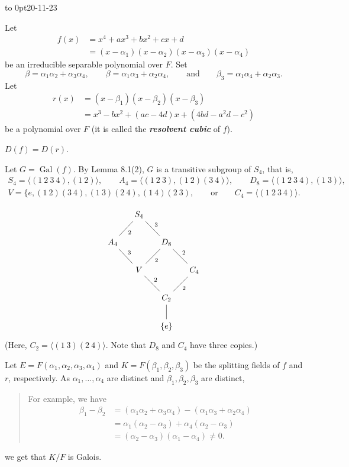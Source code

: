 \documentclass[twoside]{article}
\DeclareMathOperator\Gal{Gal}
\theoremstyle{remark}
\newcommand*\term[1]{\textbf{\textit{\mathversion{bold}#1}}}
\newcommand*\newclass[1]{\par\vbox to 0pt{\hbox{\tiny\sffamily\color{gray}#1}} \par\ignorespaces}
\begin{document}
\newclass{20-11-23}

Let
\begin{align*}
  f(x) & = x^4 + ax^3 + bx^2 + cx + d \\
  & = (x-\alpha_1)(x-\alpha_2)(x-\alpha_3)(x-\alpha_4)
\end{align*}
be an irreducible separable polynomial over \(F\). Set
\[ \beta = \alpha_1\alpha_2 + \alpha_3\alpha_4, \qquad \beta = \alpha_1\alpha_3 + \alpha_2\alpha_4, \qquad \text{and} \qquad \beta_3 = \alpha_1\alpha_4 + \alpha_2\alpha_3. \]
Let
\begin{align*}
  r(x) & = (x-\beta_1)(x-\beta_2)(x-\beta_3) \\
  & = x^3 - bx^2 + (ac-4d)x + (4bd-a^2d-c^2)
\end{align*}
be a polynomial over \(F\) (it is called the \term{resolvent cubic} of \(f\)).

\begin{lemma}
  \(D(f) = D(r)\).
\end{lemma}

Let \(G = \Gal(f)\). By Lemma 8.1(2), \(G\) is a transitive subgroup of \(S_4\), that is,
\begin{gather*}
  S_4 = \langle (1~2~3~4), (1~2) \rangle, \qquad A_4 = \langle (1~2~3), (1~2)(3~4) \rangle, \qquad D_8 = \langle (1~2~3~4), (1~3) \rangle, \\ V = \{e, (1~2)(3~4), (1~3)(2~4), (1~4)(2~3), \qquad \text{or} \qquad C_4 = \langle (1~2~3~4) \rangle.
\end{gather*}

\begin{displaymath}
  \begin{tikzcd}[column sep=small]
    & S_4 \dlar["2",dash]\drar["3",dash] \\
    A_4\drar["3",dash] && D_8\dlar["2",dash]\drar["2",dash] \\
    & V\drar["2",dash] && C_4\dlar["2",dash] \\
    && C_2\dar[dash] \\
    && \{e\}
  \end{tikzcd}
\end{displaymath}
(Here, \(C_2 = \langle (1~3)(2~4) \rangle\). Note that \(D_8\) and \(C_4\) have three copies.)

Let \(E = F(\alpha_1,\alpha_2,\alpha_3,\alpha_4)\) and \(K = F(\beta_1,\beta_2,\beta_3)\) be the splitting fields of \(f\) and \(r\), respectively. As \(\alpha_1, \dots, \alpha_4\) are distinct and \(\beta_1, \beta_2, \beta_3\) are distinct,
\begin{quote}\small
  For example, we have
  \begin{align*}
    \beta_1 - \beta_2 & = (\alpha_1\alpha_2 + \alpha_3\alpha_4) - (\alpha_1\alpha_3 + \alpha_2\alpha_4) \\
    & = \alpha_1(\alpha_2 - \alpha_3) + \alpha_4(\alpha_2 - \alpha_3) \\
    & = (\alpha_2-\alpha_3) (\alpha_1-\alpha_4) \neq 0.
  \end{align*}
\end{quote}
we get that \(K/F\) is Galois.
\end{document}
